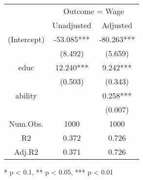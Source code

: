 \documentclass[20pt]{article}
\begin{document}

\setlength\LTleft{0.5in}
\setlength\LTright{0.5in}      

\begingroup
\huge


\captionsetup[table]{font=normal,skip=0pt}
\begin{longtable}{@{\extracolsep{\fill}}ccc}
\toprule
& \multicolumn{2}{c}{Outcome = Wage} \\ 
 \cmidrule(lr){2-3}
        & Unadjusted & Adjusted \\ 
\midrule\relax
(Intercept) & -53.085*** & -80.263*** \\ 
 & (8.492) & (5.659) \\ 
educ & 12.240*** & 9.242*** \\ 
 & (0.503) & (0.343) \\ 
ability &  & 0.258*** \\ 
 &  & (0.007) \\ 
\midrule
Num.Obs. & 1000 & 1000 \\ 
R2 & 0.372 & 0.726 \\ 
Adj.R2 & 0.371 & 0.726 \\ 
\bottomrule
\end{longtable}
\begin{minipage}{\linewidth}
* p < 0.1, ** p < 0.05, *** p < 0.01\\ 
\end{minipage}

\endgroup
\end{document}
